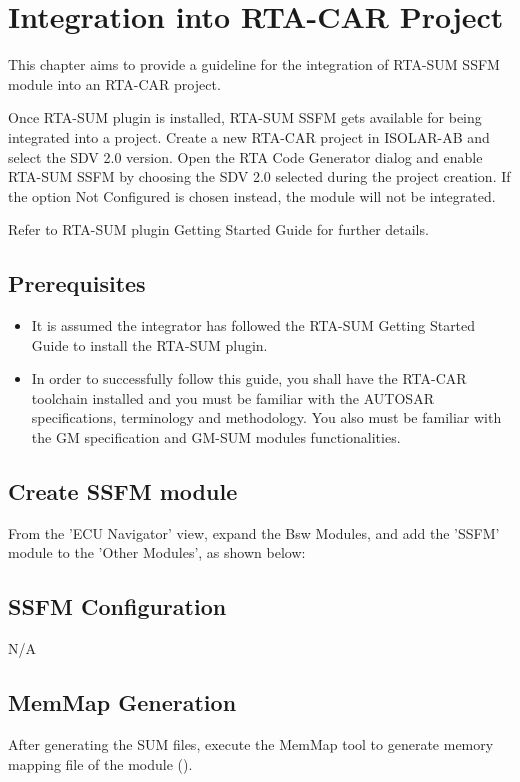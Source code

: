 \chapter{Integration into RTA-CAR Project}
\label{ch:IntGuide}

This chapter aims to provide a guideline for the integration of RTA-SUM SSFM module into an RTA-CAR project.

Once RTA-SUM plugin is installed, RTA-SUM SSFM gets available for being integrated into a project. Create a new RTA-CAR project in ISOLAR-AB and select the SDV 2.0 version. 
Open the RTA Code Generator dialog and enable RTA-SUM SSFM by choosing the SDV 2.0 selected during the project creation. If the option Not Configured is chosen instead, the module will not be integrated.

Refer to RTA-SUM plugin Getting Started Guide for further details.

\section {Prerequisites}
\begin{itemize}
\item It is assumed the integrator has followed the RTA-SUM Getting Started Guide to install the RTA-SUM plugin.
\item In order to successfully follow this guide, you shall have the RTA-CAR toolchain installed and you must be familiar with the AUTOSAR specifications, terminology and methodology. You also must be familiar with the GM specification and GM-SUM modules functionalities.
\end{itemize}

\section{Create SSFM module}

From the 'ECU Navigator' view, expand the Bsw Modules, and add the 'SSFM' module to the 'Other Modules', as shown below:


\section{SSFM Configuration}
N/A

\section{MemMap Generation}
\label{sec:MemMap}

After generating the SUM files, execute the MemMap tool to generate memory mapping file of the module ().